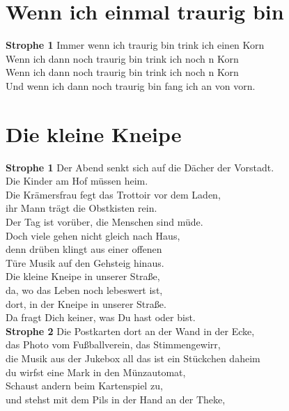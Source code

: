 \documentclass[twoside,8pt]{scrartcl}
\begin{document}
\clearpage
\section{Wenn ich einmal traurig bin}
\textbf{Strophe 1}
\newline
Immer wenn ich traurig bin trink ich einen Korn\\
Wenn ich dann noch traurig bin trink ich noch n Korn\\
Wenn ich dann noch traurig bin trink ich noch n Korn\\
Und wenn ich dann noch traurig bin fang ich an von vorn.\\

\clearpage
\section{Die kleine Kneipe}
\textbf{Strophe 1}
\newline
Der Abend senkt sich auf die Dächer der Vorstadt.\\ 
Die Kinder am Hof müssen heim.\\ 
Die Krämersfrau fegt das Trottoir vor dem Laden,\\ 
ihr Mann trägt die Obstkisten rein.\\
Der Tag ist vorüber, die Menschen sind müde.\\
Doch viele gehen nicht gleich nach Haus,\\
denn drüben klingt aus einer offenen\\
Türe Musik auf den Gehsteig hinaus.\\
Die kleine Kneipe in unserer Straße, \\
da, wo das Leben noch lebeswert ist,\\
dort, in der Kneipe in unserer Straße. \\
Da fragt Dich keiner, was Du hast oder bist.\\
\newline
\textbf{Strophe 2}
\newline
Die Postkarten dort an der Wand in der Ecke,\\
das Photo vom Fußballverein, das Stimmengewirr,\\
die Musik aus der Jukebox all das ist ein Stückchen daheim\\
du wirfst eine Mark in den Münzautomat,\\
Schaust andern beim Kartenspiel zu,\\
 und stehst mit dem Pils in der Hand an der Theke,\\
\end{document}
